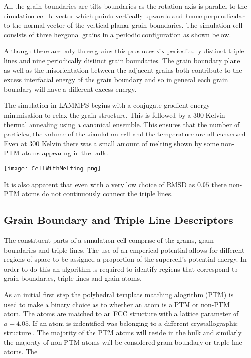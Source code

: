 \documentclass[12pt,a4paper]{book}
\begin{document}
All the grain boundaries are tilts boundaries as the rotation axis is parallel to the simulation cell $\mathbf{k}$ vector which points vertically upwards and hence perpendicular to the normal vector of the vertical planar grain boundaries. The simulation cell consists of three hexgonal grains in a periodic configuration as shown below.

Although there are only three grains this produces six periodically distinct triple lines and nine periodically distinct grain boundaries. The grain boundary plane as well as the misorientation between the adjacent grains both contribute to the excess interfacial energy of the grain boundary and so in general each grain boundary will have a different excess energy.

The simulation in LAMMPS begins with a conjugate gradient energy minimisation to relax the grain structure. This is followed by a $300$ Kelvin thermal annealing using a canonical ensemble. This ensures that the number of particles, the volume of the simulation cell and the temperature are all conserved.  Even at $300$ Kelvin there was a small amount of melting shown by some non-PTM atoms appearing in the bulk. 

\texttt{[image: CellWithMelting.png]} 

It is also apparent that even with a very low choice of RMSD as $0.05$ there non-PTM atoms do not continuously connect the triple lines. 


\subsection{Grain Boundary and Triple Line Descriptors}

The constituent parts of a simulation cell comprise of the grains, grain boundaries and triple lines. The use of an emperical potential allows for different regions of space to be assigned a proportion of the supercell's potential energy. In order to do this an algorithm is required to identify regions that correspond to grain boundaries, triple lines and grain atoms.

As an initial first step the polyhedral template matching alogrithm (PTM) is used to make a binary choice as to whether an atom is a PTM or non-PTM atom. The atoms are matched to an FCC structure with a lattice parameter of $a=4.05$. If an atom is indentified was belonging to a different crystallographic structure . The majority of the PTM atoms will reside in the bulk and similarly the majority of non-PTM atoms will be considered grain boundary or triple line atoms. The 
\end{document}
